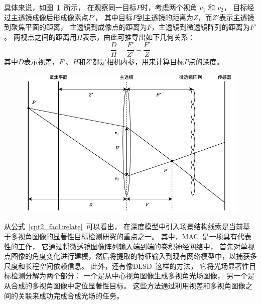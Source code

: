 具体来说，如图~\ref{cpt2_fig8:multi_array}~所示，
在观察同一目标$P$时，考虑两个视角 $v_{1}$ 和 $v_{2}$，
目标经过主透镜成像后形成像素点$P'$，
其中目标$P$到主透镜的距离为$Z$，而$Z'$表示主透镜到聚焦平面的距离，
主透镜到成像点的距离为$F$，主透镜到微透镜阵列的距离为$F'$。
两视点之间的距离用$H$表示，由此可推导出如下几何关系：
%
%
\begin{equation}
	\frac{D}{H} = \frac{F'}{Z'} - \frac{F'}{Z} 
	\label{cpt2_fac1:relate}
\end{equation}
%
%
其中$D$表示视差，$F'$、$H$和$Z'$都是相机内参，用来计算目标$P$点的深度。\par
%
%
\begin{figure}[!ht]
	\centering
	\includegraphics[width=0.80\linewidth]{figures/chapter2/microlens_array_imaging.drawio}
	\label{cpt2_fig8:multi_array}
\end{figure}
%
%
%
%
从公式~\ref{cpt2_fac1:relate}~可以看出，
在深度模型中引入场景结构线索是当前基于多视角图像的显著性目标检测研究的重点之一。
其中，MAC~\cite{zhang2020light}是一项具有代表性的工作，
它通过将微透镜图像阵列输入端到端的卷积神经网络中，
首先对单视点图像的角度变化进行建模，然后将提取的特征输入到现有网络模型中，以捕获多尺度和长程空间依赖信息。
%
%
%
此外，还有像DLSD~\cite{piao2019deep}这样的方法，
它将光场显著性目标检测分解为两个部分：
一个是从中心视角图像生成多视角光场图像，
另一个是从合成的多视角图像中定位显著性目标。
这些方法通过利用视差和多视角图像之间的关联来成功完成合成光场的任务。
%
%
